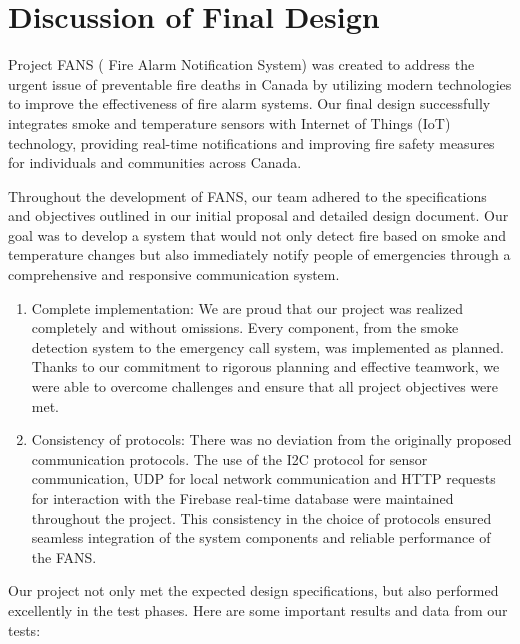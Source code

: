 \section{Discussion of Final Design}

Project FANS ( Fire Alarm Notification System) was created to address the urgent issue of preventable fire deaths in
Canada by utilizing modern technologies to improve the effectiveness of fire alarm systems. Our final design
successfully integrates smoke and temperature sensors with Internet of Things (IoT) technology, providing real-time
notifications and improving fire safety measures for individuals and communities across Canada.

Throughout the development of FANS, our team adhered to the specifications and objectives outlined in our initial
proposal and detailed design document. Our goal was to develop a system that would not only detect fire based on smoke
and temperature changes but also immediately notify people of emergencies through a comprehensive and responsive
communication system.

\begin{enumerate}
    \item Complete implementation: We are proud that our project was realized completely and without omissions. Every component, from the smoke detection system to the emergency call system, was implemented as planned. Thanks to our commitment to rigorous planning and effective teamwork, we were able to overcome challenges and ensure that all project objectives were met.
    \item Consistency of protocols: There was no deviation from the originally proposed communication protocols. The use of the I2C protocol for sensor communication, UDP for local network communication and HTTP requests for interaction with the Firebase real-time database were maintained throughout the project. This consistency in the choice of protocols ensured seamless integration of the system components and reliable performance of the FANS.
\end{enumerate}

Our project not only met the expected design specifications, but also performed excellently in the test phases. Here are
some important results and data from our tests:

